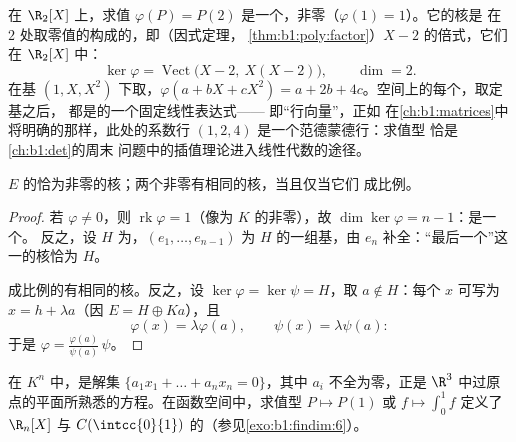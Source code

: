 \begin{example}[求值型及其超平面]
\label{ex:b1:linmaps:evaluationform}
在 $\R_2[X]$ 上，求值 $\varphi(P) = P(2)$ 是一个，非零（$\varphi(1) = 1$）。它的核是
在 $2$ 处取零值的构成的，即（因式定理，
\cref{thm:b1:poly:factor}）$X - 2$ 的倍式，它们在
$\R_2[X]$ 中：
\[
\ker\varphi = \operatorname{Vect}\bigl(X - 2,\ X(X - 2)\bigr),
\qquad \dim = 2 .
\]
在基 $(1, X, X^2)$ 下取，$\varphi(a + bX + cX^2) = a +
2b + 4c$。空间上的每个，取定基之后，
都是的一个固定线性表达式——
即“行向量”，正如
在\cref{ch:b1:matrices}中将明确的那样，此处的系数行
$(1, 2, 4)$ 是一个范德蒙德行：求值型
恰是\cref{ch:b1:det}的周末
问题中的插值理论进入线性代数的途径。
\end{example}

\begin{theorem}\label{thm:b1:linmaps:hyperplanes}
$E$ 的恰为非零的核；两个非零有相同的核，当且仅当它们
成比例。
\end{theorem}

\begin{proof}
若 $\varphi \neq 0$，则 $\operatorname{rk}\varphi = 1$（像为
$K$ 的非零），故 $\dim\ker\varphi = n - 1$：是一个。
反之，设 $H$ 为，$(e_1, \dots, e_{n-1})$ 为
$H$ 的一组基，由 $e_n$ 补全：“最后一个”这一的核恰为
$H$。

成比例的有相同的核。反之，设
$\ker\varphi = \ker\psi = H$，取 $a \notin H$：每个 $x$ 可写为
$x = h + \lambda a$（因 $E = H \oplus Ka$），且
\[
\varphi(x) = \lambda \varphi(a), \qquad \psi(x) = \lambda\psi(a):
\]
于是 $\varphi = \frac{\varphi(a)}{\psi(a)}\,\psi$。
\end{proof}

\begin{example}\label{ex:b1:linmaps:hyperplane}
在 $K^n$ 中，是解集 $\{a_1 x_1 + \dots + a_n
x_n = 0\}$，其中 $a_i$ 不全为零，正是
$\R^3$ 中过原点的平面所熟悉的方程。在函数空间中，求值型
$P \mapsto P(1)$ 或 $f \mapsto \int_0^1 f$ 定义了
$\R_n[X]$ 与 $C(\intcc{0}{1})$ 的（参见\cref{exo:b1:findim:6}）。
\end{example}

